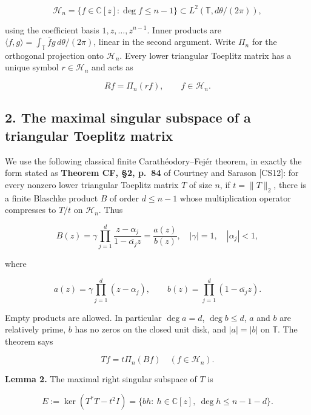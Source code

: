 \documentclass[10pt,a4paper]{article}
\begin{document}
\nopagebreak[4]

\[
\mathcal H_n=\{f\in\mathbb C[z]:\deg f\le n-1\}
\subset L^2(\mathbb T,d\theta/(2\pi)),
\]

using the coefficient basis \(1,z,\ldots,z^{n-1}\). Inner products are
\(\langle f,g\rangle=\int_{\mathbb T}\overline f g\,d\theta/(2\pi)\),
linear in the second argument. Write \(\Pi_n\) for the orthogonal
projection onto \(\mathcal H_n\). Every lower triangular Toeplitz matrix
has a unique symbol \(r\in\mathcal H_n\) and acts as

\nopagebreak[4]

\[
R f=\Pi_n(rf),\qquad f\in\mathcal H_n.
\tag{2}
\]

\subsection{2. The maximal singular subspace of a triangular Toeplitz
matrix}\label{the-maximal-singular-subspace-of-a-triangular-toeplitz-matrix}

We use the following classical finite Carathéodory--Fejér theorem, in
exactly the form stated as \textbf{Theorem CF, §2, p.~84} of Courtney
and Sarason {[}CS12{]}: for every nonzero lower triangular Toeplitz
matrix \(T\) of size \(n\), if \(t=\|T\|_2\), there is a finite Blaschke
product \(B\) of order \(d\le n-1\) whose multiplication operator
compresses to \(T/t\) on \(\mathcal H_n\). Thus

\nopagebreak[4]

\[
B(z)=\gamma\prod_{j=1}^{d}\frac{z-\alpha_j}{1-\overline{\alpha_j}z}
=\frac{a(z)}{b(z)},
\quad |\gamma|=1,\quad |\alpha_j|<1,
\tag{3}
\]

where

\nopagebreak[4]

\[
a(z)=\gamma\prod_{j=1}^{d}(z-\alpha_j),\qquad
b(z)=\prod_{j=1}^{d}(1-\overline{\alpha_j}z).
\]

Empty products are allowed. In particular \(\deg a=d\), \(\deg b\le d\),
\(a\) and \(b\) are relatively prime, \(b\) has no zeros on the closed
unit disk, and \(|a|=|b|\) on \(\mathbb T\). The theorem says

\nopagebreak[4]

\[
Tf=t\Pi_n(Bf)\quad(f\in\mathcal H_n).
\tag{4}
\]

\textbf{Lemma 2.} The maximal right singular subspace of \(T\) is

\nopagebreak[4]

\[
E:=\ker(T^*T-t^2I)
=\{b h:\ h\in\mathbb C[z],\ \deg h\le n-1-d\}.
\tag{5}
\]
\end{document}
